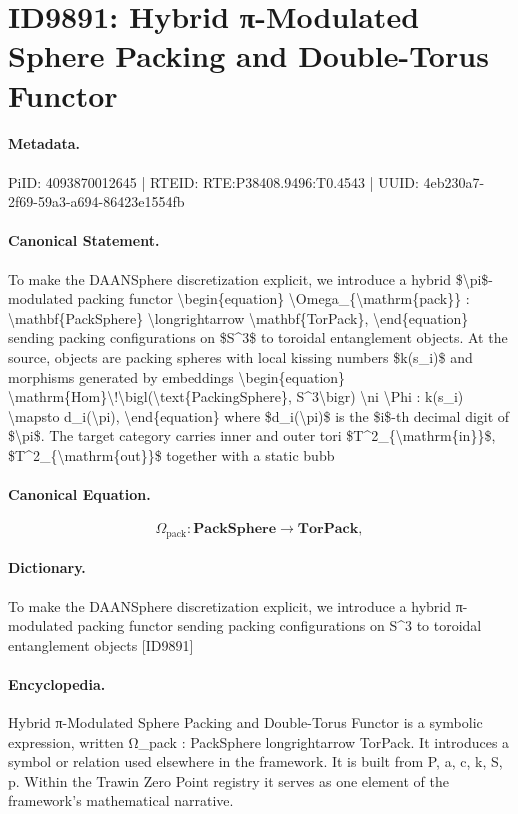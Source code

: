 \section*{ID9891: Hybrid π-Modulated Sphere Packing and Double-Torus Functor}
\paragraph{Metadata.}
PiID: 4093870012645 | RTEID: RTE:P38408.9496:T0.4543 | UUID: 4eb230a7-2f69-59a3-a694-86423e1554fb

\paragraph{Canonical Statement.}
To make the DAANSphere discretization explicit, we introduce a hybrid \$\textbackslash{}pi\$-modulated packing functor \textbackslash{}begin\{equation\} \textbackslash{}Omega\_\{\textbackslash{}mathrm\{pack\}\} : \textbackslash{}mathbf\{PackSphere\} \textbackslash{}longrightarrow \textbackslash{}mathbf\{TorPack\}, \textbackslash{}end\{equation\} sending packing configurations on \$S\textasciicircum{}3\$ to toroidal entanglement objects. At the source, objects are packing spheres with local kissing numbers \$k(s\_i)\$ and morphisms generated by embeddings \textbackslash{}begin\{equation\} \textbackslash{}mathrm\{Hom\}\textbackslash{}!\textbackslash{}bigl(\textbackslash{}text\{PackingSphere\}, S\textasciicircum{}3\textbackslash{}bigr) \textbackslash{}ni \textbackslash{}Phi : k(s\_i) \textbackslash{}mapsto d\_i(\textbackslash{}pi), \textbackslash{}end\{equation\} where \$d\_i(\textbackslash{}pi)\$ is the \$i\$-th decimal digit of \$\textbackslash{}pi\$. The target category carries inner and outer tori \$T\textasciicircum{}2\_\{\textbackslash{}mathrm\{in\}\}\$, \$T\textasciicircum{}2\_\{\textbackslash{}mathrm\{out\}\}\$ together with a static bubb

\paragraph{Canonical Equation.}
\[
\Omega_{\mathrm{pack}} : \mathbf{PackSphere} \longrightarrow \mathbf{TorPack},
\]

\paragraph{Dictionary.}
To make the DAANSphere discretization explicit, we introduce a hybrid π-modulated packing functor sending packing configurations on S\textasciicircum{}3 to toroidal entanglement objects [ID9891]

\paragraph{Encyclopedia.}
Hybrid π-Modulated Sphere Packing and Double-Torus Functor is a symbolic expression, written Ω\_pack : PackSphere longrightarrow TorPack. It introduces a symbol or relation used elsewhere in the framework. It is built from P, a, c, k, S, p. Within the Trawin Zero Point registry it serves as one element of the framework's mathematical narrative.
